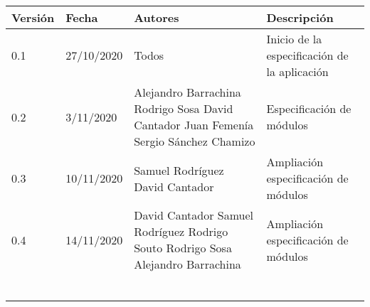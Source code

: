 \documentclass[12pt]{article}
\begin{document}
\noindent\begin{tabularx}{\textwidth}{ |l|l|p{5cm}|X| }
    \hline
    \textbf{Versión} & \textbf{Fecha} & \textbf{Autores}                                                                         & \textbf{Descripción}                         \\
    \hline
    0.1              & 27/10/2020     & Todos                                                                                    & Inicio de la especificación de la aplicación \\
    \hline
    0.2              & 3/11/2020      & Alejandro Barrachina  Rodrigo Sosa  David Cantador  Juan Femenía  Sergio Sánchez Chamizo & Especificación de módulos                    \\
    \hline
    0.3              & 10/11/2020     & Samuel Rodríguez David Cantador                                                          & Ampliación especificación de módulos         \\
    \hline
    0.4              & 14/11/2020     & David Cantador  Samuel Rodríguez  Rodrigo Souto  Rodrigo Sosa  Alejandro Barrachina      & Ampliación especificación de módulos         \\
    \hline
                     &                &                                                                                          &                                              \\
    \hline
                     &                &                                                                                          &                                              \\
    \hline
                     &                &                                                                                          &                                              \\
    \hline
                     &                &                                                                                          &                                              \\
    \hline
                     &                &                                                                                          &                                              \\
    \hline
                     &                &                                                                                          &                                              \\
    \hline
\end{tabularx}

\newpage
\tableofcontents
\newpage


\newpage

\newpage

\end{document}
